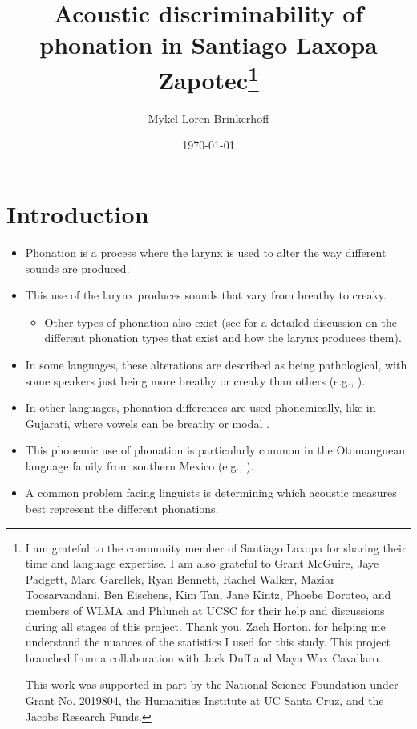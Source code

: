 \documentclass[12pt, letterpaper]{article}
\title{Acoustic discriminability of phonation in Santiago Laxopa Zapotec\thanks{I am grateful to the community member of Santiago Laxopa for sharing their time and language expertise. I am also grateful to Grant McGuire, Jaye Padgett, Marc Garellek, Ryan Bennett, Rachel Walker, Maziar Toosarvandani, Ben Eischens, Kim Tan, Jane Kintz, Phoebe Doroteo, and members of WLMA and Phlunch at UCSC for their help and discussions during all stages of this project. Thank you, Zach Horton, for helping me understand the nuances of the statistics I used for this study. This project branched from a collaboration with Jack Duff and Maya Wax Cavallaro.

This work was supported in part by the National Science Foundation under Grant No. 2019804, the Humanities Institute at UC Santa Cruz, and the Jacobs Research Funds.}}
\author{Mykel Loren Brinkerhoff}
\date{\today}
\begin{document}
	

    \onehalfspacing

\maketitle

\tableofcontents

\section{Introduction} \label{sec:Introduction}

\begin{itemize}
    \item Phonation is a process where the larynx is used to alter the way different sounds are produced. 
	\item This use of the larynx produces sounds that vary from breathy to creaky.
	\begin{itemize}
		\item Other types of phonation also exist (see \cite{eslingVoiceQualityLaryngeal2019} for a detailed discussion on the different phonation types that exist and how the larynx produces them).
	\end{itemize} 
	\item In some languages, these alterations are described as being pathological, with some speakers just being more breathy or creaky than others (e.g., \cite{klattAnalysisSynthesisPerception1990}). 
    \item In other languages, phonation differences are used phonemically, like in Gujarati, where vowels can be breathy or modal \citep{fischer-jorgensenPhoneticAnalysisBreathy1968}. 
    \item This phonemic use of phonation is particularly common in the Otomanguean language family from southern Mexico (e.g., \cite{suarezMesoamericanIndianLanguages1983,campbellMesoAmericaLinguisticArea1986,silvermanLaryngealComplexityOtomanguean1997,campbellOtomangueanHistoricalLinguistics2017a,campbellOtomangueanHistoricalLinguistics2017}).
    \item A common problem facing linguists is determining which acoustic measures best represent the different phonations. 
\end{itemize}
\end{document}
